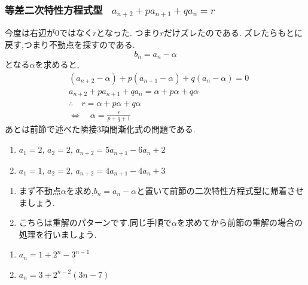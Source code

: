   \subsubsection{\texorpdfstring{等差二次特性方程式型 \, $\displaystyle a_{n+2}+pa_{n+1}+qa_n=r$}{等差二次特性方程式型}}
    今度は右辺が0ではなく$r$となった.
    つまり$r$だけズレたのである.
    ズレたらもとに戻す,つまり不動点を探すのである.
    \[
      b_n=a_n-\alpha
    \]
    となる$\alpha$を求めると,
    \begin{align*}
      &(a_{n+2}-\alpha)+p(a_{n+1}-\alpha)+q(a_n-\alpha)=0\\
      &a_{n+2}+pa_{n+1}+qa_n=\alpha+p\alpha+q\alpha\\
      &\therefore \quad r=\alpha +p\alpha +q\alpha\\
      &\Leftrightarrow \quad \alpha=\frac{r}{p+q+1}
    \end{align*}
    あとは前節で述べた隣接3項間漸化式の問題である.

    \noindent {}
    \begin{enumerate}[label=(\arabic*),parsep=3pt,format=\bookitemlink{example-three-term-2}{problem}{answer}]
      \item $\displaystyle a_1=2,\,a_2=2,\, a_{n+2}=5a_{n+1}-6a_n+2$
      \item $\displaystyle a_1=1,\,a_2=2,\, a_{n+2}=4a_{n+1}-4a_n+3$
    \end{enumerate}

    \noindent{}
    \begin{enumerate}[label=(\arabic*),parsep=3pt,format=\bookitemlink{example-three-term-2}{hint}{problem}]
      \item まず不動点$\alpha$を求め,$b_n=a_n-\alpha$と置いて前節の二次特性方程式型に帰着させましょう.
      \item こちらは重解のパターンです.同じ手順で$\alpha$を求めてから前節の重解の場合の処理を行いましょう.
    \end{enumerate}

    \noindent{}
    \begin{enumerate}[label=(\arabic*),parsep=3pt,format=\bookitemlink{example-three-term-2}{answer}{problem}]
      \item $\displaystyle a_n=1+2^n-3^{n-1}$
      \item $\displaystyle a_n=3+2^{n-2}(3n-7)$
    \end{enumerate}

